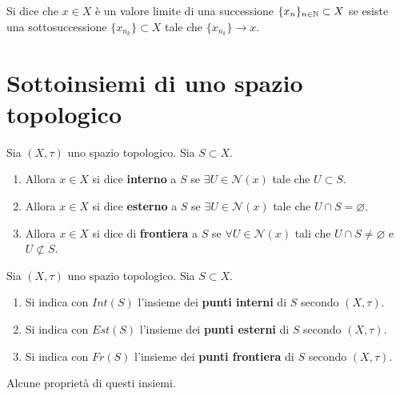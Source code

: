 \begin{definition}
	Si dice che $x \in X$ è un valore limite di una successione $\{x_n\}_{n\in \mathbb{N}} \subset X$ se esiste una sottosuccessione $\{x_{n_k}\} \subset X$ tale che $\{x_{n_k}\} \rightarrow x$.
\end{definition}

\section{Sottoinsiemi di uno spazio topologico}

\begin{definition}
	Sia $(X, \tau)$ uno spazio topologico. Sia $S \subset X$. 
	\begin{enumerate}
		\item Allora $x \in X$ si dice \textbf{interno} a $S$ se $\exists U \in \mathcal{N}(x)$ tale che $U \subset S$.
		\item Allora $x \in X$ si dice \textbf{esterno} a $S$ se $\exists U \in \mathcal{N}(x)$ tale che $U \cap S = \varnothing$.
		\item Allora $x \in X$ si dice di \textbf{frontiera} a $S$ se $\forall U \in \mathcal{N}(x)$ tali che $U \cap S \neq \varnothing$ e $U \not\subset S$.
	\end{enumerate}
\end{definition}

\begin{definition}
	Sia $(X, \tau)$ uno spazio topologico. Sia $S \subset X$. 
	\begin{enumerate}
		\item Si indica con $Int(S)$ l'insieme dei \textbf{punti interni} di $S$ secondo $(X,\tau)$.
		\item Si indica con $Est(S)$ l'insieme dei \textbf{punti esterni} di $S$ secondo $(X,\tau)$.
		\item Si indica con $Fr(S)$ l'insieme dei \textbf{punti frontiera} di $S$ secondo $(X,\tau)$.
	\end{enumerate}
\end{definition}	

Alcune proprietà di questi insiemi.

